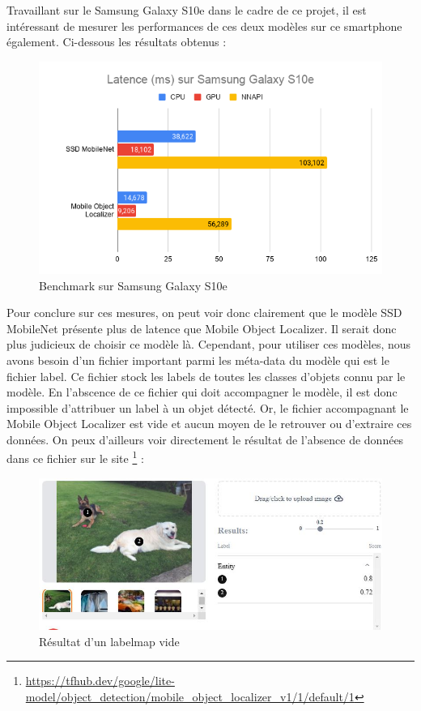 \documentclass[UTF8]{EPURapport}
\begin{document}
Travaillant sur le Samsung Galaxy S10e dans le cadre de ce projet, il est intéressant de mesurer les performances de ces deux modèles sur ce smartphone également. Ci-dessous les résultats obtenus :

\begin{figure}[h!]
\centering
  \includegraphics[width=\textwidth]{images/bench_s10e.png}
  \caption{Benchmark sur Samsung Galaxy S10e}
  \label{fig:benchs10e}
\end{figure}

Pour conclure sur ces mesures, on peut voir donc clairement que le modèle SSD MobileNet présente plus de latence que Mobile Object Localizer. Il serait donc plus judicieux de choisir ce modèle là. Cependant, pour utiliser ces modèles, nous avons besoin d'un fichier important parmi les méta-data du modèle qui est le fichier label. Ce fichier stock les labels de toutes les classes d'objets connu par le modèle. En l'abscence de ce fichier qui doit accompagner le modèle, il est donc impossible d'attribuer un label à un objet détecté. Or, le fichier accompagnant le Mobile Object Localizer est vide et aucun moyen de le retrouver ou d'extraire ces données.  On peux d'ailleurs voir directement le résultat de l'absence de données dans ce fichier sur le site \footnote{\url{https://tfhub.dev/google/lite-model/object_detection/mobile_object_localizer_v1/1/default/1}} :

\begin{figure}[h!]
\centering
  \includegraphics[width=\textwidth]{images/labels_empty.JPG}
  \caption{Résultat d'un labelmap vide}
  \label{fig:labelsempty}
\end{figure}
\end{document}
